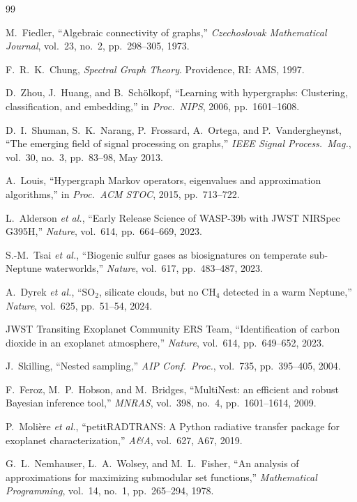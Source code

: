 \documentclass[conference]{IEEEtran}
\begin{document}
\begin{thebibliography}{99}

M.~Fiedler,
``Algebraic connectivity of graphs,''
\textit{Czechoslovak Mathematical Journal}, vol.~23, no.~2,
pp.~298--305, 1973.

F.~R.~K.~Chung,
\textit{Spectral Graph Theory}.
Providence, RI: AMS, 1997.

D.~Zhou, J.~Huang, and B.~Sch\"{o}lkopf,
``Learning with hypergraphs: Clustering, classification, and embedding,''
in \textit{Proc.\ NIPS}, 2006, pp.~1601--1608.

D.~I.~Shuman, S.~K.~Narang, P.~Frossard, A.~Ortega, and
P.~Vandergheynst,
``The emerging field of signal processing on graphs,''
\textit{IEEE Signal Process.\ Mag.}, vol.~30, no.~3,
pp.~83--98, May 2013.

A.~Louis,
``Hypergraph Markov operators, eigenvalues and approximation algorithms,''
in \textit{Proc.\ ACM STOC}, 2015, pp.~713--722.

L.~Alderson \textit{et al.},
``Early Release Science of WASP-39b with JWST NIRSpec G395H,''
\textit{Nature}, vol.~614, pp.~664--669, 2023.

S.-M.~Tsai \textit{et al.},
``Biogenic sulfur gases as biosignatures on temperate sub-Neptune
waterworlds,''
\textit{Nature}, vol.~617, pp.~483--487, 2023.

A.~Dyrek \textit{et al.},
``SO$_2$, silicate clouds, but no CH$_4$ detected in a warm Neptune,''
\textit{Nature}, vol.~625, pp.~51--54, 2024.

JWST Transiting Exoplanet Community ERS Team,
``Identification of carbon dioxide in an exoplanet atmosphere,''
\textit{Nature}, vol.~614, pp.~649--652, 2023.

J.~Skilling,
``Nested sampling,''
\textit{AIP Conf.\ Proc.}, vol.~735, pp.~395--405, 2004.

F.~Feroz, M.~P.~Hobson, and M.~Bridges,
``MultiNest: an efficient and robust Bayesian inference tool,''
\textit{MNRAS}, vol.~398, no.~4, pp.~1601--1614, 2009.

P.~Moli\`{e}re \textit{et al.},
``petitRADTRANS: A Python radiative transfer package for exoplanet
characterization,''
\textit{A\&A}, vol.~627, A67, 2019.

G.~L.~Nemhauser, L.~A.~Wolsey, and M.~L.~Fisher,
``An analysis of approximations for maximizing submodular set functions,''
\textit{Mathematical Programming}, vol.~14, no.~1,
pp.~265--294, 1978.


\end{thebibliography}
\end{document}
